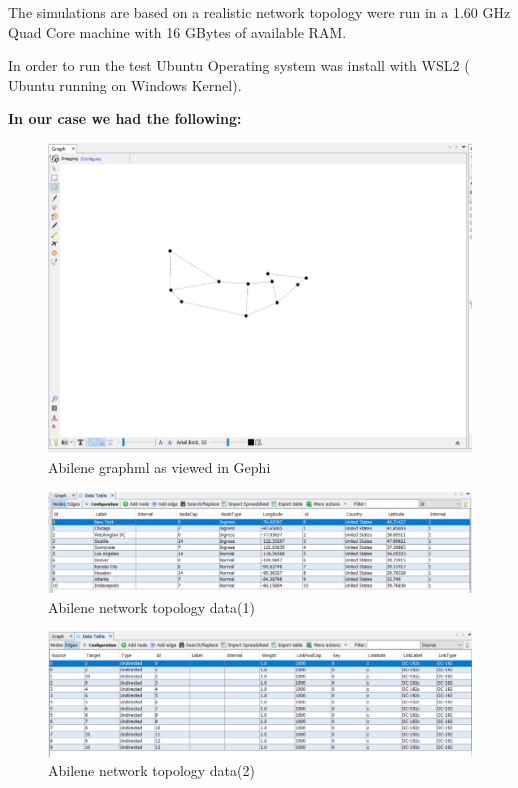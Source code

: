 The simulations are based on a realistic network topology were run in 
 a 1.60 GHz Quad Core machine with 16 GBytes of available RAM.

In order to run the test Ubuntu Operating system was install with WSL2 ( Ubuntu running on Windows Kernel).
 
\textbf{In our case we had the following:} 


\begin{figure}[h]
    \centering
    \includegraphics[width=1\textwidth]{abilene_gephi}
    \caption{Abilene graphml as viewed in Gephi}
    \label{fig:abilene_gephi}
\end{figure}

\begin{figure}[h]
    \centering
    \includegraphics[width=1\textwidth]{input_graph_data}
    \caption{Abilene network topology data(1)}
    \label{fig:input_graph_data}
\end{figure}

\begin{figure}[h]
    \centering
    \includegraphics[width=1\textwidth]{input_graph_edges}
    \caption{Abilene network topology data(2)}
    \label{fig:input_graph_edges}
\end{figure}

